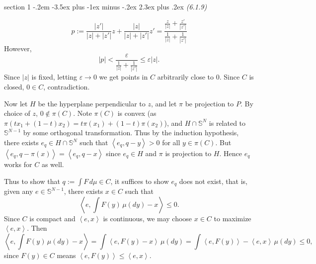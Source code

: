 \documentclass[12pt]{article}
\makeatletter
\theoremstyle{norm}
\newcommand{\bS}[0]{\mathbb{S}}
\newcommand{\nin}[0]{\not\in}
\newcommand{\rc}[1]{\frac{1}{#1}}
\newcommand{\ep}[0]{\varepsilon}
\newcommand{\pa}[1]{\left( {#1} \right)}
\newcommand{\an}[1]{\left\langle {#1}\right\rangle}
\newenvironment{problem}{\@startsection
       {section}
       {1}
       {-.2em}
       {-3.5ex plus -1ex minus -.2ex}
       {2.3ex plus .2ex}
       {\pagebreak[3]%
       \large\bf\noindent{Problem }
       }
       }
       {%
       }
\makeatother
\begin{document}
\begin{problem}{\it(6.1.9)}
\begin{enumerate}
\[
p:=\frac{|z'|}{|z|+|z'|}z+\frac{|z|}{|z|+|z'|}z'
=\frac{\frac{z}{|z|}+\frac{z'}{|z'|}}{\rc{|z|}+\rc{|z'|}}
\]
However,
\[
|p|<\frac{\ep}{\rc{|z|}+\rc{|z'|}}\le \ep|z|.
\]
Since $|z|$ is fixed, letting $\ep\to 0$ we get points in $C$ arbitrarily close to 0. Since $C$ is closed, $0\in C$, contradiction.
\end{enumerate}
Now let $H$ be the hyperplane perpendicular to $z$, and let $\pi$ be  projection to $P$. By choice of $z$, $0\nin\pi(C)$. Note $\pi(C)$ is convex (as $\pi(tx_1+(1-t)x_2)=t\pi(x_1)+(1-t)\pi(x_2)$), and $H\cap \bS^{N}$ is related to $\bS^{N-1}$ by some orthogonal transformation. Thus by the induction hypothesis, there exists $e_q\in H\cap \bS^N$ such that $\an{e_q, q-y}>0$ for all $y\in \pi(C)$. But $\an{e_q,q-\pi(x)}=\an{e_q,q-x}$ since $e_q\in H$ and $\pi$ is projection to $H$. Hence $e_q$ works for $C$ as well.



Thus to show that $q:=\int F\,d\mu\in C$, it suffices to show $e_q$ does not exist, that is, given any $e\in \bS^{N-1}$, there exists $x\in C$ such that
\[
\an{e,\int F(y)\,\mu(dy)-x}\le 0.
\]
Since $C$ is compact and $\an{e,x}$ is continuous, we may choose $x\in C$ to maximize $\an{e,x}$. Then
\[
\an{e,\int F(y)\,\mu(dy)-x}=\int \an{e, F(y)-x}\,\mu(dy)=\int \an{e, F(y)}-\an{e,x}\,\mu(dy)\le 0,
\]
since $F(y)\in C$ means $\an{e,F(y)}\le \an{e,x}$.\\



\end{problem}
\end{document}

